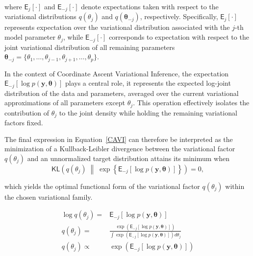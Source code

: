 where $\mathsf{E}_{j}\left[\cdot\right]$ and $\mathsf{E}_{-j}\left[\cdot\right]$ denote expectations taken with respect to the variational distributions $q(\theta_j)$ and $q(\bm{\theta}_{-j})$, respectively. Specifically, $\mathsf{E}_{j}\left[\cdot\right]$ represents expectation over the variational distribution associated with the $j$-th model parameter $\theta_j$, while $\mathsf{E}_{-j}\left[\cdot\right]$ corresponds to expectation with respect to the joint variational distribution of all remaining parameters $\bm{\theta}_{-j} = \{\theta_1,\dots,\theta_{j-1},\theta_{j+1},\dots,\theta_p\}$.

\vspace{0.5cm}

In the context of Coordinate Ascent Variational Inference, the expectation $\mathsf{E}_{-j}\left[\log p(\bm{y},\bm{\theta})\right]$ plays a central role, it represents the expected log-joint distribution of the data and parameters, averaged over the current variational approximations of all parameters except $\theta_j$. This operation effectively isolates the contribution of $\theta_j$ to the joint density while holding the remaining variational factors fixed.

\newpage

The final expression in Equation~\ref{CAVI} can therefore be interpreted as the minimization of a Kullback-Leibler divergence between the variational factor $q(\theta_j)$ and an unnormalized target distribution attains its minimum when
$$
\mathsf{KL}\left(
q(\theta_j)\;\middle\|\;
\exp\left\{\mathsf{E}_{-j}\left[\log p(\bm{y},\bm{\theta})\right]\right\}
\right)=0,
$$

which yields the optimal functional form of the variational factor $q(\theta_j)$ within the chosen variational family.


\begin{equation}
\begin{split}
\label{MVFB_opt}
   \log q\left(\theta_j\right)=& \mathsf{E}_{{- j}}\left[\log{p(\bm{y},\bm{\theta})}\right]\\
             q\left(\theta_j\right)=&\frac{\exp{\left(\mathsf{E}_{{-j}}\left[\log{p(\bm{y},\bm{\theta})}\right]\right)}}{\int \exp{\left(\mathsf{E}_{{- j}}\left[\log{p(\bm{y},\bm{\theta})}\right]\right)} d\theta_j}\\
            q\left(\theta_j\right)\propto& \exp{\left(\mathsf{E}_{{- j}}\left[\log{p(\bm{y},\bm{\theta})}\right]\right)}
\end{split}    
\end{equation}

